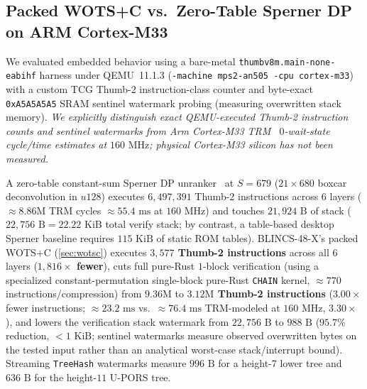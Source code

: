 \documentclass[11pt,a4paper]{article}
\theoremstyle{definition}
\theoremstyle{remark}
\newcommand{\BLINCS}{\textsf{BLINCS-48-X}}
\newcommand{\WOTSC}{\textsf{WOTS+C}}
\newcommand{\UPORS}{\textsf{U-PORS}}
\begin{document}
\subsection{Packed \WOTSC{} vs.\ Zero-Table Sperner DP on ARM Cortex-M33}
{\sloppy
We evaluated embedded behavior using a bare-metal \texttt{thumbv8m.main-\allowbreak none-\allowbreak eabihf} harness under QEMU~11.1.3 (\texttt{-machine mps2-an505 -cpu cortex-m33}) with a custom TCG Thumb-2 instruction-class counter and byte-exact \texttt{0xA5A5A5A5} SRAM sentinel watermark probing (measuring overwritten stack memory). \emph{We explicitly distinguish exact QEMU-executed Thumb-2 instruction counts and sentinel watermarks from Arm Cortex-M33 TRM~\cite{arm2020m33trm} $0$-wait-state cycle/time estimates at $160\text{ MHz}$; physical Cortex-M33 silicon has not been measured.}

A zero-table constant-sum Sperner DP unranker~\cite{zhang2023csum,khovratovich2025hypercube} at $S = 679$ ($21 \times 680$ boxcar deconvolution in $u128$) executes $6{,}497{,}391$ Thumb-2 instructions across $6$ layers ($\approx 8.86\text{M}$ TRM cycles $\approx 55.4\text{ ms}$ at $160\text{ MHz}$) and touches $21{,}924\text{ B}$ of stack ($22{,}756\text{ B} = 22.22\text{ KiB}$ total verify stack; by contrast, a table-based desktop Sperner baseline requires $115\text{ KiB}$ of static ROM tables). \BLINCS{}'s packed \WOTSC{} (\cref{sec:wotsc}) executes \textbf{$3{,}577$ Thumb-2 instructions} across all $6$ layers (\textbf{$1{,}816\times$ fewer}), cuts full pure-Rust $1$-block verification (using a specialized constant-permutation single-block pure-Rust \texttt{CHAIN} kernel, $\approx 770$ instructions/compression) from $9.36\text{M}$ to \textbf{$3.12\text{M}$ Thumb-2 instructions} ($3.00\times$ fewer instructions; $\approx 23.2\text{ ms}$ vs.\ $\approx 76.4\text{ ms}$ TRM-modeled at $160\text{ MHz}$, $3.30\times$), and lowers the verification stack watermark from $22{,}756\text{ B}$ to \textbf{$988\text{ B}$} ($95.7\%$ reduction, $< 1\text{ KiB}$; sentinel watermarks measure observed overwritten bytes on the tested input rather than an analytical worst-case stack/interrupt bound). Streaming \texttt{TreeHash} watermarks measure $996\text{ B}$ for a height-$7$ lower tree and $636\text{ B}$ for the height-$11$ \UPORS{} tree.
}
\end{document}
